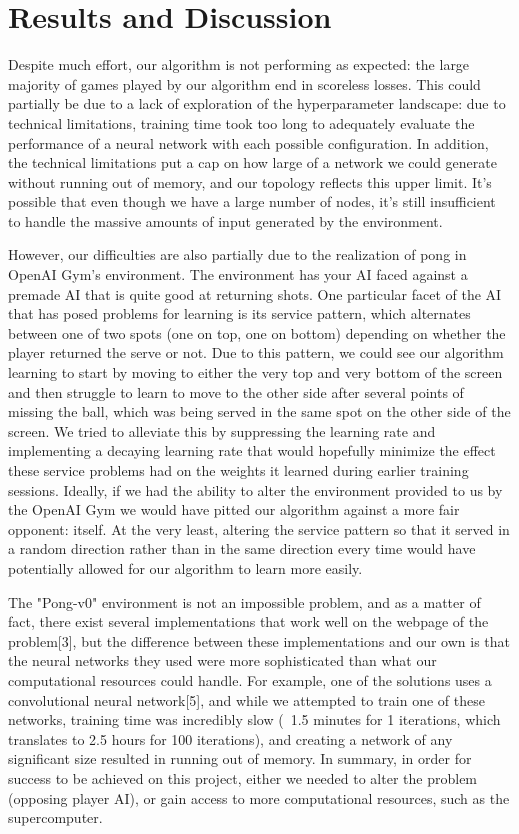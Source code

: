 \documentclass[12pt]{article}
\theoremstyle{plain}
\theoremstyle{definition}
\theoremstyle{remark}
\theoremstyle{plain}
\begin{document}
\section{Results and Discussion}
\par 
Despite much effort, our algorithm is not performing as expected: the large majority of games played by our algorithm end in scoreless losses.  This could partially be due to a lack of exploration of the hyperparameter landscape: due to technical limitations, training time took too long to adequately evaluate the performance of a neural network with each possible configuration.  In addition, the technical limitations put a cap on how large of a network we could generate without running out of memory, and our topology reflects this upper limit.  It's possible that even though we have a large number of nodes, it's still insufficient to handle the massive amounts of input generated by the environment.
\par
However, our difficulties are also partially due to the realization of pong in OpenAI Gym's environment.  The environment has your AI faced against a premade AI that is quite good at returning shots.  One particular facet of the AI that has posed problems for learning is its service pattern, which alternates between one of two spots (one on top, one on bottom) depending on whether the player returned the serve or not.  Due to this pattern, we could see our algorithm learning to start by moving to either the very top and very bottom of the screen and then struggle to learn to move to the other side after several points of missing the ball, which was being served in the same spot on the other side of the screen.  We tried to alleviate this by suppressing the learning rate and implementing a decaying learning rate that would hopefully minimize the effect these service problems had on the weights it learned during earlier training sessions.  Ideally, if we had the ability to alter the environment provided to us by the OpenAI Gym we would have pitted our algorithm against a more fair opponent: itself.  At the very least, altering the service pattern so that it served in a random direction rather than in the same direction every time would have potentially allowed for our algorithm to learn more easily.
\par
The "Pong-v0" environment is not an impossible problem, and as a matter of fact, there exist several implementations that work well on the webpage of the problem[3], but the difference between these implementations and our own is that the neural networks they used were more sophisticated than what our computational resources could handle.  For example, one of the solutions uses a convolutional neural network[5], and while we attempted to train one of these networks, training time was incredibly slow (~1.5 minutes for 1 iterations, which translates to 2.5 hours for 100 iterations), and creating a network of any significant size resulted in running out of memory.  In summary, in order for success to be achieved on this project, either we needed to alter the problem (opposing player AI), or gain access to more computational resources, such as the supercomputer.
\end{document}

